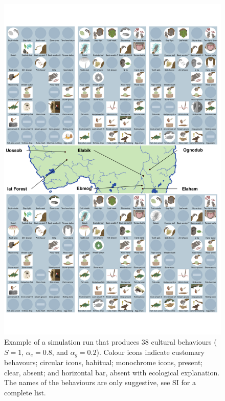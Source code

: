 \documentclass[9pt,twocolumn,twoside,]{pnas-new}
\begin{document}
\begin{figure}[h!]
\begin{center}
\includegraphics[width=13.8cm]{figures/figure_2.pdf}
\caption{Example of a simulation run that produces 38 cultural behaviours ($S=1$, $\alpha_e=0.8$, and $\alpha_g=0.2$). Colour icons indicate customary behavours; circular icons, habitual; monochrome icons, present; clear, absent; and horizontal bar, absent with ecological explanation. The names of the behaviours are only suggestive, see SI for a complete list.}
\label{Figure2}
\end{center}
\end{figure}
\end{document}

